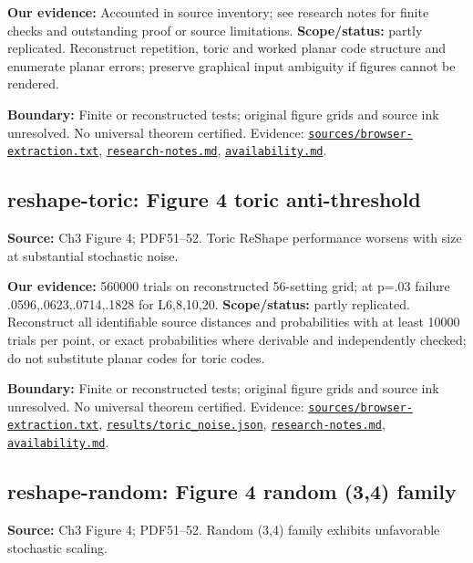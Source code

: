 \documentclass[11pt]{article}
\begin{document}
\textbf{Our evidence:} Accounted in source inventory; see research notes for finite checks and outstanding proof or source limitations. \textbf{Scope/status:} partly replicated. Reconstruct repetition, toric and worked planar code structure and enumerate planar errors; preserve graphical input ambiguity if figures cannot be rendered.

\textbf{Boundary:} Finite or reconstructed tests; original figure grids and source ink unresolved. No universal theorem certified. Evidence: \href{https://github.com/alectionary/vibe-math/blob/master/formalization/quintavalle-hgp/sources/browser-extraction.txt}{\nolinkurl{sources/browser-extraction.txt}}, \href{https://github.com/alectionary/vibe-math/blob/master/formalization/quintavalle-hgp/research-notes.md}{\nolinkurl{research-notes.md}}, \href{https://github.com/alectionary/vibe-math/blob/master/formalization/quintavalle-hgp/availability.md}{\nolinkurl{availability.md}}.
\subsection{reshape-toric: Figure 4 toric anti-threshold}
\label{claim:reshape-toric}
\textbf{Source:} Ch3 Figure 4; PDF51--52. Toric ReShape performance worsens with size at substantial stochastic noise.

\textbf{Our evidence:} 560000 trials on reconstructed 56-setting grid; at p=.03 failure .0596,.0623,.0714,.1828 for L6,8,10,20. \textbf{Scope/status:} partly replicated. Reconstruct all identifiable source distances and probabilities with at least 10000 trials per point, or exact probabilities where derivable and independently checked; do not substitute planar codes for toric codes.

\textbf{Boundary:} Finite or reconstructed tests; original figure grids and source ink unresolved. No universal theorem certified. Evidence: \href{https://github.com/alectionary/vibe-math/blob/master/formalization/quintavalle-hgp/sources/browser-extraction.txt}{\nolinkurl{sources/browser-extraction.txt}}, \href{https://github.com/alectionary/vibe-math/blob/master/formalization/quintavalle-hgp/results/toric_noise.json}{\nolinkurl{results/toric_noise.json}}, \href{https://github.com/alectionary/vibe-math/blob/master/formalization/quintavalle-hgp/research-notes.md}{\nolinkurl{research-notes.md}}, \href{https://github.com/alectionary/vibe-math/blob/master/formalization/quintavalle-hgp/availability.md}{\nolinkurl{availability.md}}.
\subsection{reshape-random: Figure 4 random (3,4) family}
\label{claim:reshape-random}
\textbf{Source:} Ch3 Figure 4; PDF51--52. Random (3,4) family exhibits unfavorable stochastic scaling.
\end{document}
